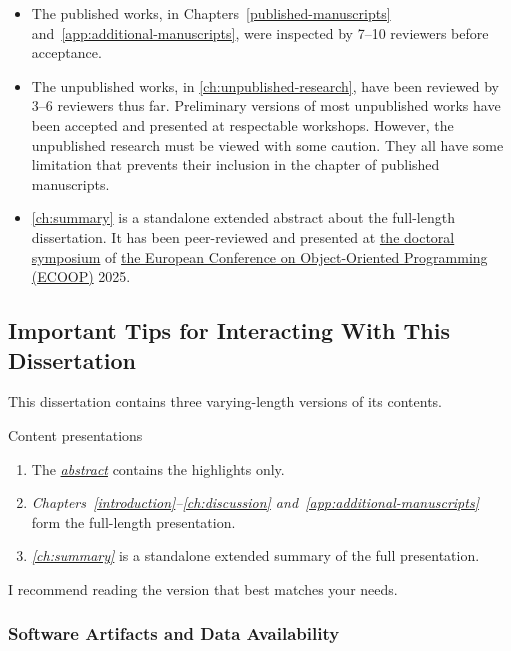 \begin{itemize}

\item The published works, in Chapters~\ref{published-manuscripts} and~\ref{app:additional-manuscripts}, were inspected by 7--10 reviewers before acceptance.

\item The unpublished works, in \autoref{ch:unpublished-research}, have been reviewed by 3--6 reviewers thus far.
Preliminary versions of most unpublished works have been accepted and presented at respectable workshops.
However, the unpublished research must be viewed with some caution.
They all have some limitation that prevents their inclusion in the chapter of published manuscripts.

\item \autoref{ch:summary} is a standalone extended abstract about the full-length dissertation.
It has been peer-reviewed and presented at \href{https://2025.ecoop.org/track/ecoop-2025-doctoral-symposium}{the doctoral symposium} of \href{https://2025.ecoop.org}{the European Conference on Object-Oriented Programming (ECOOP)} 2025.

\end{itemize}

\subsection{Important Tips for Interacting With This Dissertation}
\label{subsec:tips}

This dissertation contains three varying-length versions of its contents.

\begin{infobox}[]{Content presentations}
\begin{enumerate}[wide, labelwidth=!, labelindent=0pt]
\item The \emph{\hyperref[abs]{abstract}} contains the highlights only.
\item \emph{Chapters~\ref{introduction}--\ref{ch:discussion} and~\ref{app:additional-manuscripts}} form the full-length presentation.
\item \emph{\autoref{ch:summary}} is a standalone extended summary of the full presentation.
\end{enumerate}
\end{infobox}

I recommend reading the version that best matches your needs.

\subsubsection{Software Artifacts and Data Availability}

